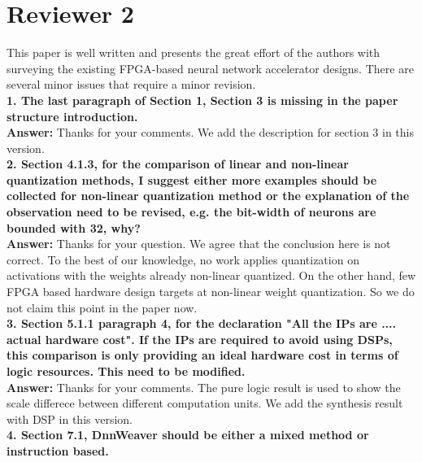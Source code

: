 \documentclass[12pt]{paper}
\newcommand{\reviewer}[1]{\section*{Reviewer #1}}
\newcommand{\answer}[1]{\noindent\textbf{Answer:} #1}
\newcommand{\comment}[1]{\noindent\textbf{#1}\\}
\begin{document}
\reviewer{2}

This paper is well written and presents the great effort of the authors with surveying the existing FPGA-based neural network accelerator designs. There are several minor issues that require a minor revision.\\

\comment{1.	The last paragraph of Section 1, Section 3 is missing in the paper structure introduction.}

\answer{Thanks for your comments. We add the description for section 3 in this version.}\\

\comment{2. Section 4.1.3, for the comparison of linear and non-linear quantization methods, I suggest either more examples should be collected for non-linear quantization method or the explanation of the observation need to be revised, e.g. the bit-width of neurons are bounded with 32, why?}

\answer{Thanks for your question. We agree that the conclusion here is not correct. To the best of our knowledge, no work applies quantization on activations with the weights already non-linear quantized. On the other hand, few FPGA based hardware design targets at non-linear weight quantization. So we do not claim this point in the paper now.}\\

\comment{3.	Section 5.1.1 paragraph 4, for the declaration "All the IPs are .... actual hardware cost". If the IPs are required to avoid using DSPs, this comparison is only providing an ideal hardware cost in terms of logic resources. This need to be modified.}

\answer{Thanks for your comments. The pure logic result is used to show the scale differece between different computation units. We add the synthesis result with DSP in this version.} \\

\comment{4.	Section 7.1, DnnWeaver should be either a mixed method or instruction based.}
\end{document}
